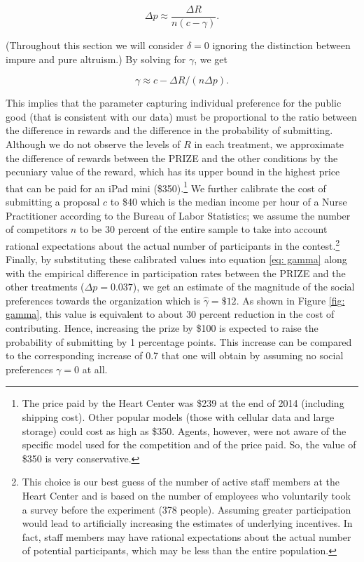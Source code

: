 \documentclass[12pt, titlepage]{article}
\begin{document}
\begin{equation}
  \Delta p \approx\frac{\Delta R}{n (c - \gamma)}.
\end{equation}

(Throughout this section we will consider \(\delta=0\) ignoring the
distinction between impure and pure altruism.) By solving for
\(\gamma\), we get

\begin{equation}
  \label{eq: gamma}
  \gamma   \approx  c -  \Delta R / (n\Delta p). 
\end{equation}

This implies that the parameter capturing individual preference for the
public good (that is consistent with our data) must be proportional to
the ratio between the difference in rewards and the difference in the
probability of submitting. Although we do not observe the levels of
\(R\) in each treatment, we approximate the difference of rewards
between the PRIZE and the other conditions by the pecuniary value of the
reward, which has its upper bound in the highest price that can be paid
for an iPad mini (\$350).\footnote{The price paid by the Heart Center
  was \$239 at the end of 2014 (including shipping cost). Other popular
  models (those with cellular data and large storage) could cost as high
  as \$350. Agents, however, were not aware of the specific model used
  for the competition and of the price paid. So, the value of \$350 is
  very conservative.} We further calibrate the cost of submitting a
proposal \(c\) to \$40 which is the median income per hour of a Nurse
Practitioner according to the Bureau of Labor Statistics; we assume the
number of competitors \(n\) to be 30 percent of the entire sample to
take into account rational expectations about the actual number of
participants in the contest.\footnote{This choice is our best guess of
  the number of active staff members at the Heart Center and is based on
  the number of employees who voluntarily took a survey before the
  experiment (378 people). Assuming greater participation would lead to
  artificially increasing the estimates of underlying incentives. In
  fact, staff members may have rational expectations about the actual
  number of potential participants, which may be less than the entire
  population.} Finally, by substituting these calibrated values into
equation \eqref{eq: gamma} along with the empirical difference in
participation rates between the PRIZE and the other treatments
(\(\Delta p=0.037\)), we get an estimate of the magnitude of the social
preferences towards the organization which is \(\hat\gamma=\$12\). As
shown in Figure \ref{fig: gamma}, this value is equivalent to about 30
percent reduction in the cost of contributing. Hence, increasing the
prize by \$100 is expected to raise the probability of submitting by 1
percentage points. This increase can be compared to the corresponding
increase of 0.7 that one will obtain by assuming no social preferences
\(\gamma=0\) at all.
\end{document}
